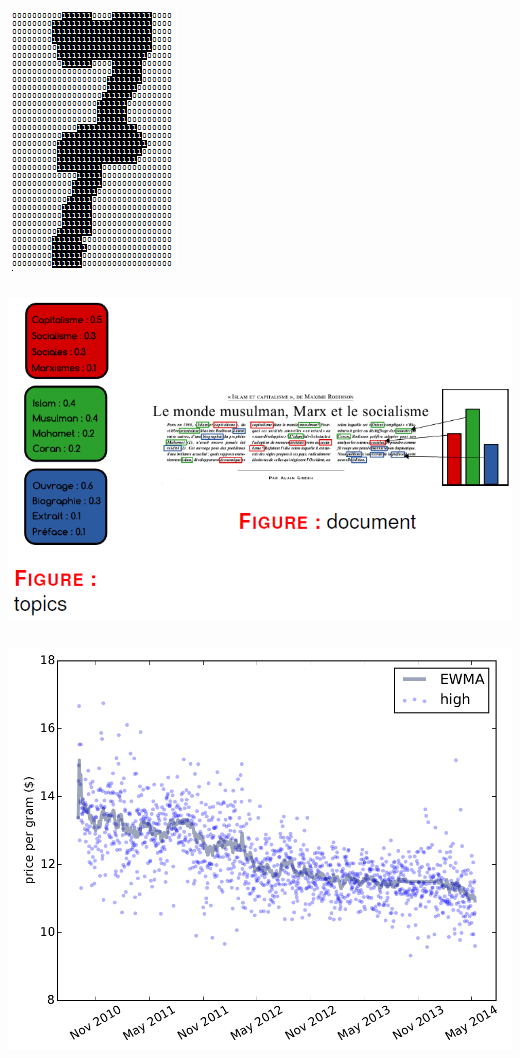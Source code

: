 \documentclass[11pt]{beamer}
\newenvironment{slide}[1]{%
\begin{frame}[environment=slide]
\frametitle{#1}
}{%
\end{frame}
}
\begin{document}
\begin{slide}{}

\includegraphics[scale=0.75]{A5imagerecognition}

\end{slide}

\begin{slide}{}

\includegraphics[scale=0.35]{A6topicrecognition}

\end{slide}

\begin{slide}{}

\includegraphics[scale=0.25]{A7regression}

\end{slide}
\end{document}
